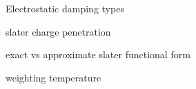 Electrostatic damping types

slater charge penetration

exact vs approximate slater functional form

weighting temperature
